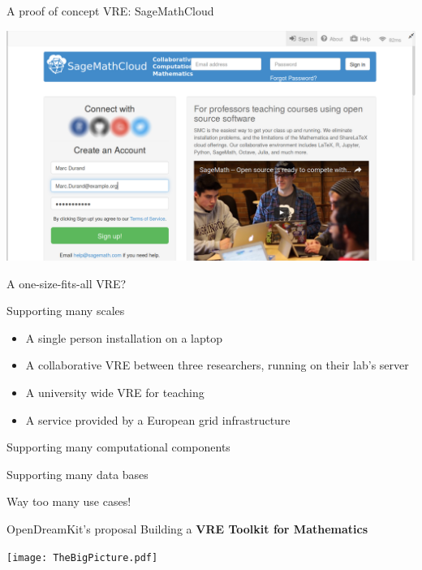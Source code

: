 \documentclass{beamer}
\begin{document}
\begin{frame}{A proof of concept VRE: SageMathCloud}
  \centerline{\includegraphics[width=\textwidth]{smc.png}}
\end{frame}

\begin{frame}{A one-size-fits-all VRE?}
  \pause
  \begin{block}{Supporting many scales}
    \begin{itemize}
    \item A single person installation on a laptop
    \item A collaborative VRE between three researchers, running on
      their lab's server
    \item A university wide VRE for teaching
    \item A service provided by a European grid infrastructure
    \end{itemize}
  \end{block}
  \pause

  \begin{block}{Supporting many computational components}
  \end{block}
  \pause

  \begin{block}{Supporting many data bases}
  \end{block}
  \pause

  \centerline{\color{red}Way too many use cases!}
\end{frame}

\begin{frame}{OpenDreamKit's proposal}\label{our-proposal}
  Building a \textbf{VRE Toolkit for Mathematics}
  \pause\bigskip

  \texttt{[image: TheBigPicture.pdf]}
\end{frame}
\end{document}
